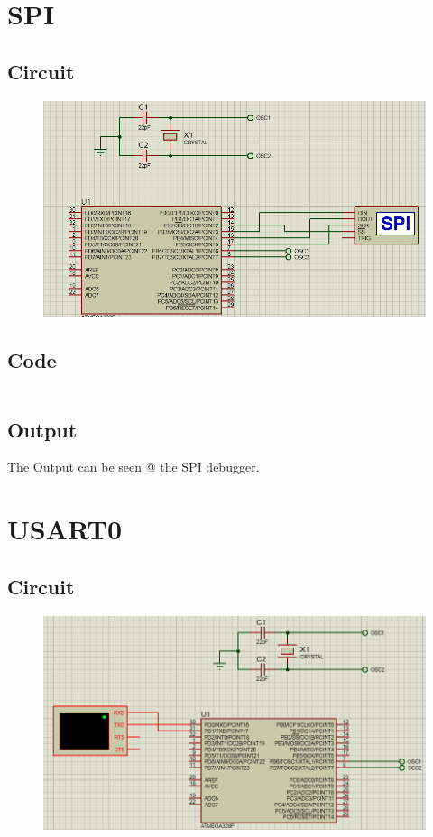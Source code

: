 \documentclass[oneside]{book}
\begin{document}
\section{SPI}
\subsection{Circuit}
\begin{figure}[H]
    \centering
    \includegraphics[height=0.2\textheight]{SPI.png}
\end{figure}
\subsection{Code}
\inputminted[bgcolor=black]{c}{./programFiles/SPI.c}
\subsection{Output}
\quad The Output can be seen @ the SPI debugger.


\section{USART0}
\subsection{Circuit}
\begin{figure}[H]
    \centering
    \includegraphics[height=0.2\textheight]{USART0.png}
\end{figure}
\end{document}
